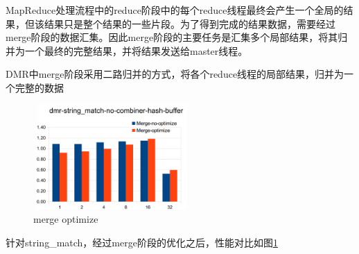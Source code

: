 MapReduce处理流程中的reduce阶段中的每个reduce线程最终会产生一个全局的结果，但该结果只是整个结果的一些片段。为了得到完成的结果数据，需要经过merge阶段的数据汇集。因此merge阶段的主要任务是汇集多个局部结果，将其归并为一个最终的完整结果，并将结果发送给master线程。

DMR中merge阶段采用二路归并的方式，将各个reduce线程的局部结果，归并为一个完整的数据

\begin{figure}[!h]
    \centering
    \includegraphics[height=4cm,width=6cm]{img/merge_opt.png}
    \caption{merge optimize}
\label{merge_opt}
\end{figure}
针对string\_match，经过merge阶段的优化之后，性能对比如图\ref{merge_opt}
